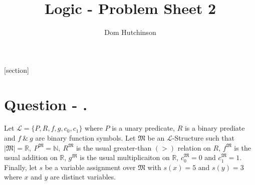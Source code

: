 \documentclass[11pt,a4paper]{article}
\begin{document}
\pagestyle{fancy}
\setlength\parindent{0pt}
\allowdisplaybreaks

\renewcommand{\headrulewidth}{0pt}

\title{Logic - Problem Sheet 2}
\author{Dom Hutchinson}
\maketitle

\fancyhead[R]{\today}

[section]

\newcommand{\dotprod}[0]{\boldsymbol{\cdot}}
\newcommand{\cosech}[0]{\mathrm{cosech}\ }
\newcommand{\cosec}[0]{\mathrm{cosec}\ }
\newcommand{\sech}[0]{\mathrm{sech}\ }
\newcommand{\prob}[0]{\mathbb{P}}
\newcommand{\nats}[0]{\mathbb{N}}
\newcommand{\cov}[0]{\mathrm{cov}}
\newcommand{\var}[0]{\mathrm{var}}
\newcommand{\expect}[0]{\mathbb{E}}
\newcommand{\reals}[0]{\mathbb{R}}
\newcommand{\integers}[0]{\mathbb{Z}}
\newcommand{\indicator}[0]{\mathds{1}}
\newcommand{\nb}[0]{\textit{N.B.} }
\newcommand{\ie}[0]{\textit{i.e.} }
\newcommand{\eg}[0]{\textit{e.g.} }
\newcommand{\iid}[0]{\overset{\text{iid}}{\sim} }
\newcommand{\x}[0]{\textbf{x} }
\newcommand{\X}[0]{\textbf{X} }
\newcommand{\LL}[0]{\mathcal{L} }
\newcommand{\M}[0]{\mathfrak{M} }

\newcommand{\qpart}[0]{\stepcounter{qpart} \textbf{Question \arabic{section} \alph{qpart})\\}}
\newcommand{\qpartnb}[0]{\stepcounter{qpart} \textbf{Question \arabic{section} \alph{qpart})} - }
\newcommand{\ans}[0]{ \textbf{Answer \arabic{section}\\}}
\newcommand{\apart}[0]{ \textbf{Answer \arabic{section} \alph{qpart})\\}}
\newcommand{\apartnb}[0]{\textbf{Answer \arabic{section} \alph{qpart})} - }
\newcommand{\question}[0]{\section*{Question - .}}

\question
Let $\LL=\{P,R,f,g,c_0,c_1\}$ where $P$ is a unary predicate, $R$ is a binary prediate and $f\ \&\ g$ are binary function symbols. Let $\M$ be an $\LL$-Structure such that $|\M|=\reals,\ P^\M=\nats,\ R^\M$ is the usual greater-than $(>)$ relation on $R$, $f^\M$ is the usual addition on $\reals$, $g^\M$ is the usual multiplicaiton on $\reals$, $c_0^\M=0$ and $c_1^\M=1$. Finally, let $s$ be a variable assignment over $\M$ with $s(x)=5$ and $s(y)=3$ where $x$ and $y$ are distinct variables.\\
\end{document}
